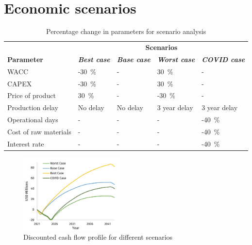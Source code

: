 
\section{Economic scenarios}

\begin{table}[H]
\centering
\caption{Percentage change in parameters for scenario analysis}
\label{tab:scenario_analysis}
\begin{tabular}{@{}l|llll@{}}
\toprule
                      & \multicolumn{4}{c}{\textbf{Scenarios}}                                                        \\
\textbf{Parameter}    & \textit{\textbf{Best case}} & \textit{\textbf{Base case}} & \textit{\textbf{Worst case}} & \textit{\textbf{COVID case}} \\ \midrule
WACC                  & -\SI{30}{\percent}                       & -                          & \SI{30}{\percent}                         & -                            \\
CAPEX                 & -\SI{30}{\percent}                       & -                          & \SI{30}{\percent}                         & -                            \\
Price of product      & \SI{30}{\percent}                        & -                          & -\SI{30}{\percent}                        & -                            \\
Production delay      & No delay                    & No delay                   & 3 year delay                 & 3 year delay                 \\
Operational days      & -                           & -                          & -                            & -\SI{40}{\percent}                        \\
Cost of raw materials & -                           & -                          & -                            & -\SI{40}{\percent}                        \\
Interest rate         & -                           & -                          & -                            & -\SI{40}{\percent}                        \\\bottomrule
\end{tabular}
\end{table}

\begin{figure}
    \vspace{-0.9cm}
    \includegraphics[width=0.47\textwidth]{chapters/6-economics/figures/DCF.jpg}
    \caption{Discounted cash flow profile for different scenarios}
    \label{DCF_scenario}
\end{figure}

